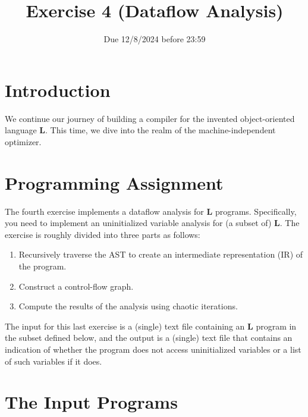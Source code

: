 \documentclass{article}
\begin{document}
\title{Exercise 4 (Dataflow Analysis)}


\date{Due 12/8/2024 before 23:59}

\maketitle

\newcommand{\plname}{\textbf{L}\xspace}

\section{Introduction}
We continue our journey of building a compiler
for the invented object-oriented language \plname.
This time, we dive into the realm of the machine-independent optimizer. 
 
\section{Programming Assignment}
The fourth exercise implements a dataflow analysis for \plname programs.
Specifically, you need to implement an uninitialized variable analysis for (a subset of) \plname.
The exercise is roughly divided into three parts as follows:
\begin{enumerate}
\item Recursively traverse the AST to create
an intermediate representation (IR) of the program.
\item Construct a control-flow graph.
\item Compute the results of the analysis using chaotic iterations.
\end{enumerate}

The input for this last exercise is a (single) text file containing an \plname
program in the subset defined below,
and the output is a (single) text file that contains an indication of whether the program does not access uninitialized variables or a list of such variables if it does.

\section{The Input Programs}
\end{document}
